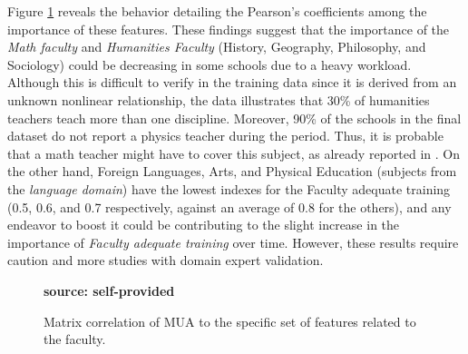 Figure \ref{fig:matrix_correlation} reveals the behavior detailing the Pearson’s coefficients among the importance of these features. These findings suggest that the importance of the \textit{Math faculty} and \textit{Humanities Faculty} (History, Geography, Philosophy, and Sociology) could be decreasing in some schools due to a heavy workload. Although this is difficult to verify in the training data since it is derived from an unknown nonlinear relationship, the data illustrates that 30\% of humanities teachers teach more than one discipline. Moreover, 90\% of the schools in the final dataset do not report a physics teacher during the period. Thus, it is probable that a math teacher might have to cover this subject, as already reported in  \cite{Santos2012APhysics}. On the other hand, Foreign Languages, Arts, and Physical Education (subjects from the \textit{language domain}) have the lowest indexes for the Faculty adequate training (0.5, 0.6, and 0.7 respectively, against an average of 0.8 for the others), and any endeavor to boost it could be contributing to the slight increase in the importance of \textit{Faculty adequate training} over time. However, these results require caution and more studies with domain expert validation. 

\begin{figure}[ht!]
\centering
\caption{\textmd{Matrix correlation of MUA to the specific set of features related to the faculty.}}
\label{fig:matrix_correlation}
\par\medskip\ABNTEXfontereduzida\selectfont
\textbf{source: self-provided}  
\par\medskip
\end{figure}

